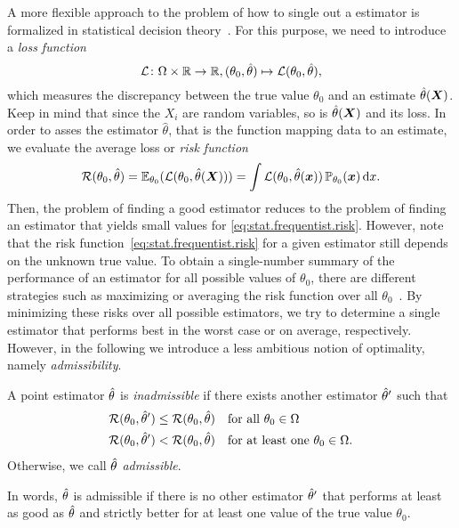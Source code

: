 A more flexible approach to the problem of how to single out a  estimator is formalized in statistical decision theory~\cite{Casella_2008_Statistical,Lehmann_1998_Theory}.
For this purpose, we need to introduce a \emph{loss function}
\[
  \label{eq:stat.frequentist.loss_function}
  \mathcal{L}\colon \Omega \times \mathbb{R} \to \mathbb{R},  (\theta_0, \hat{\theta}) \mapsto \mathcal{L}(\theta_0, \hat{\theta}),
\]
which measures the discrepancy between the true value $\theta_0$ and an estimate $\hat{\theta}({\boldsymbol{X}})$.
Keep in mind that since the $X_i$ are random variables, so is $\hat{\theta}({\boldsymbol{X}})$ and its loss.
In order to asses the estimator $\hat\theta$, that is the function mapping data to an estimate, we evaluate the average loss or \emph{risk function}
\[
  \label{eq:stat.frequentist.risk}
  \mathcal{R}(\theta_0, \hat\theta) = \mathbb{E}_{\theta_0}(\mathcal{L}(\theta_0, \hat\theta({\boldsymbol{X}})))
  = \int \mathcal{L}(\theta_0, \hat\theta({\boldsymbol{x}})) \, \mathbb{P}_{\theta_0}({\boldsymbol{x}}) \, \mathrm{d} x.
\]
Then, the problem of finding a good estimator reduces to the problem of finding an estimator that yields small values for \cref{eq:stat.frequentist.risk}.
However, note that the risk function~\eqref{eq:stat.frequentist.risk} for a given estimator still depends on the unknown true value.
To obtain a single-number summary of the performance of an estimator for all possible values of $\theta_0$, there are different strategies such as maximizing or averaging the risk function over all $\theta_0$~\cite[Sec.\ 12.2]{Wasserman_2013_All}.
By minimizing these risks over all possible estimators, we try to determine a single estimator that performs best in the worst case or on average, respectively.
However, in the following we introduce a less ambitious notion of optimality, namely \emph{admissibility}.
\begin{definition}{\cite[Def. 12.17]{Wasserman_2013_All}}%
  \label{def:stat.frequentist.admissability_point_estimators}
  A point estimator $\hat{\theta}$ is \emph{inadmissible} if there exists another estimator $\hat{\theta}'$ such that
  \begin{align*}
    \mathcal{R}(\theta_0, \hat{\theta}') \le \mathcal{R}(\theta_0, \hat{\theta}) &\quad\mbox{for all } \theta_0 \in \Omega \\
    \mathcal{R}(\theta_0, \hat{\theta}') <   \mathcal{R}(\theta_0, \hat{\theta}) &\quad\mbox{for at least one } \theta_0 \in \Omega.
  \end{align*}
  Otherwise, we call $\hat{\theta}$ \emph{admissible}.
\end{definition}
In words, $\hat{\theta}$ is admissible if there is no other estimator $\hat{\theta}'$ that performs at least as good as $\hat{\theta}$ and strictly better for at least one value of the true value $\theta_0$.

